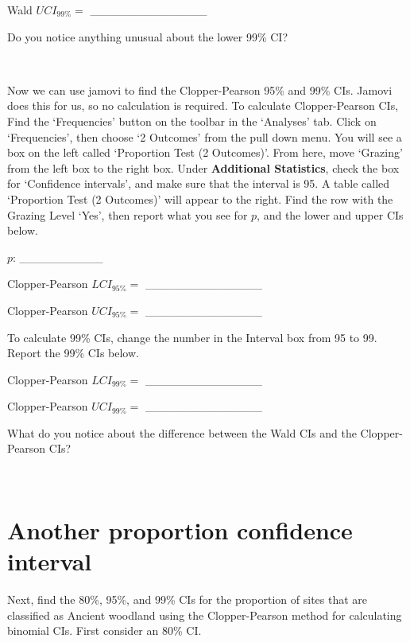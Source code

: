 \documentclass[
]{scrbook}
\begin{document}
Wald \(UCI_{99\%} =\) \_\_\_\_\_\_\_\_\_\_\_\_\_\_

Do you notice anything unusual about the lower 99\% CI?

\begin{verbatim}


\end{verbatim}

Now we can use jamovi to find the Clopper-Pearson 95\% and 99\% CIs.
Jamovi does this for us, so no calculation is required.
To calculate Clopper-Pearson CIs, Find the `Frequencies' button on the toolbar in the `Analyses' tab.
Click on `Frequencies', then choose `2 Outcomes' from the pull down menu.
You will see a box on the left called `Proportion Test (2 Outcomes)'.
From here, move `Grazing' from the left box to the right box.
Under \textbf{Additional Statistics}, check the box for `Confidence intervals', and make sure that the interval is 95.
A table called `Proportion Test (2 Outcomes)' will appear to the right.
Find the row with the Grazing Level `Yes', then report what you see for \(p\), and the lower and upper CIs below.

\(p\): \_\_\_\_\_\_\_\_\_\_

Clopper-Pearson \(LCI_{95\%} =\) \_\_\_\_\_\_\_\_\_\_\_\_\_\_

Clopper-Pearson \(UCI_{95\%} =\) \_\_\_\_\_\_\_\_\_\_\_\_\_\_

To calculate 99\% CIs, change the number in the Interval box from 95 to 99.
Report the 99\% CIs below.

Clopper-Pearson \(LCI_{99\%} =\) \_\_\_\_\_\_\_\_\_\_\_\_\_\_

Clopper-Pearson \(UCI_{99\%} =\) \_\_\_\_\_\_\_\_\_\_\_\_\_\_

What do you notice about the difference between the Wald CIs and the Clopper-Pearson CIs?

\begin{verbatim}


\end{verbatim}

\hypertarget{another-proportion-confidence-interval}{%
\section{Another proportion confidence interval}\label{another-proportion-confidence-interval}}

Next, find the 80\%, 95\%, and 99\% CIs for the proportion of sites that are classified as Ancient woodland using the Clopper-Pearson method for calculating binomial CIs.
First consider an 80\% CI.
\end{document}
